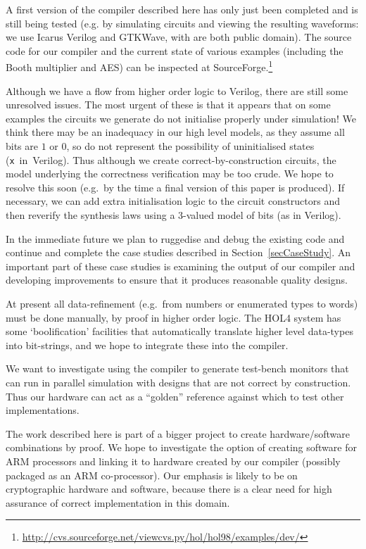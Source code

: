 

A first version of the compiler described here has only just been
completed and is still being tested (e.g. by simulating circuits and
viewing the resulting waveforms: we use Icarus Verilog and GTKWave,
with are both public domain).  The source code for our compiler and
the current state of various examples (including the Booth multiplier
and AES) can be inspected at
SourceForge.\footnote{\url{http://cvs.sourceforge.net/viewcvs.py/hol/hol98/examples/dev/}}

Although we have a flow from higher
order logic to Verilog, there are still some unresolved issues. The
most urgent of these is that it appears that on some examples the
circuits we generate do not initialise properly under simulation!  We
think there may be an inadequacy in our high level models, as they
assume all bits are $1$ or $0$, so do not represent the possibility of
uninitialised states (\texttt{x}~in~Verilog). Thus although we create
correct-by-construction circuits, the model underlying the correctness
verification may be too crude. We hope to resolve this soon (e.g.~by
the time a final version of this paper is produced). If necessary, we
can add extra initialisation logic to the circuit constructors and
then reverify the synthesis laws using a 3-valued model of bits
(as in Verilog).



In the immediate future we plan to ruggedise and debug the existing
code and continue and complete the case studies described in
Section~\ref{secCaseStudy}. An important part of these case studies is
examining the output of our compiler and developing improvements to
ensure that it produces reasonable quality designs.

At present all data-refinement (e.g.~from numbers or enumerated types
to words) must be done manually, by proof in higher order logic. The
HOL4 system has some `boolification' facilities that automatically
translate higher level data-types into bit-strings, and we hope to
integrate these into the compiler.

We want to investigate using the compiler to generate test-bench
monitors that can run in parallel simulation with designs that are not
correct by construction.  Thus our hardware can act as a ``golden''
reference against which to test other implementations.

The work described here is part of a bigger project to create
hardware/software combinations by proof.  We hope to investigate the
option of creating software for ARM processors and linking it to
    hardware created by our compiler (possibly packaged as an ARM
co-processor). Our emphasis is likely to be on cryptographic hardware
and software, because there is a clear need for high assurance of
correct implementation in this domain.

